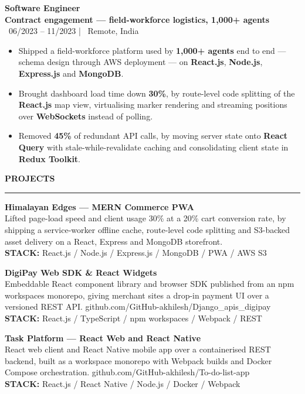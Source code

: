\documentclass[10pt]{article}
\newcommand{\resumesection}[1]{%
  \vspace{6pt}%
  {\fontfamily{phv}\selectfont\textbf{\large\MakeUppercase{#1}}}%
  \vspace{2pt}%
  \hrule%
  \vspace{4pt}%
}
\begin{document}
\vspace{4pt}
{\textbf{Software Engineer}} \\
{\textbf{\textcolor{primaryblue}{Contract engagement --- field-workforce logistics, 1,000+ agents}}} \\
{\footnotesize\textcolor{primaryblue}{\faCalendar*}~06/2023 -- 11/2023 \quad | \quad \textcolor{primaryblue}{\faMapMarker*}~Remote, India}
\begin{itemize}
    \item Shipped a field-workforce platform used by \textbf{1,000+ agents} end to end --- schema design through AWS deployment --- on \textbf{React.js}, \textbf{Node.js}, \textbf{Express.js} and \textbf{MongoDB}.
    \item Brought dashboard load time down \textbf{30\%}, by route-level code splitting of the \textbf{React.js} map view, virtualising marker rendering and streaming positions over \textbf{WebSockets} instead of polling.
    \item Removed \textbf{45\%} of redundant API calls, by moving server state onto \textbf{React Query} with stale-while-revalidate caching and consolidating client state in \textbf{Redux Toolkit}.
\end{itemize}

\resumesection{Projects}
{\textbf{Himalayan Edges --- MERN Commerce PWA}} \\
{\small Lifted page-load speed and client usage 30\% at a 20\% cart conversion rate, by shipping a service-worker offline cache, route-level code splitting and S3-backed asset delivery on a React, Express and MongoDB storefront.} \\
{\footnotesize\textbf{STACK:} React.js / Node.js / Express.js / MongoDB / PWA / AWS S3}

\vspace{4pt}
{\textbf{DigiPay Web SDK \& React Widgets}} \\
{\small Embeddable React component library and browser SDK published from an npm workspaces monorepo, giving merchant sites a drop-in payment UI over a versioned REST API. github.com/GitHub-akhilesh/Django\_apis\_digipay} \\
{\footnotesize\textbf{STACK:} React.js / TypeScript / npm workspaces / Webpack / REST}

\vspace{4pt}
{\textbf{Task Platform --- React Web and React Native}} \\
{\small React web client and React Native mobile app over a containerised REST backend, built as a workspace monorepo with Webpack builds and Docker Compose orchestration. github.com/GitHub-akhilesh/To-do-list-app} \\
{\footnotesize\textbf{STACK:} React.js / React Native / Node.js / Docker / Webpack}
\end{document}
